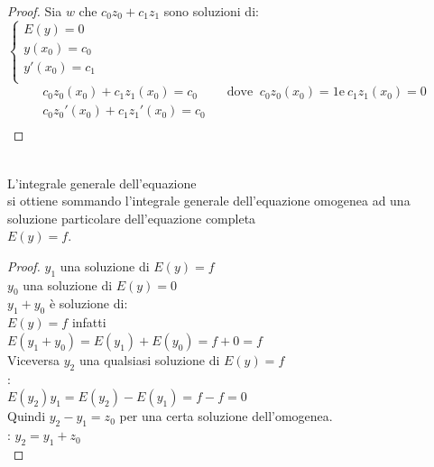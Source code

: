 \documentclass[a4paper, oneside]{article}
\begin{document}
\begin{proof}
    Sia $w$ che $c_0 z_0 + c_1 z_1$ sono soluzioni di:\\
    $
    \begin{cases}
        E(y) = 0\\
        y(x_0) = c_0\\
        y'(x_0) = c_1\\
    \end{cases}
    $
    \begin{gather*}
        c_0 z_0 (x_0) + c_1 z_1 (x_0) = c_0 \qquad \text{ dove } \ c_0 z_0 (x_0)= 1 \text{e} \ c_1 z_1 (x_0) = 0\\
        c_0 z_0' (x_0) + c_1 z_1' (x_0) = c_0 \qquad \\
    \end{gather*}
\end{proof}
\begin{theorem}
    \hfil\\
    L'integrale generale dell'equazione \\
    si ottiene sommando l'integrale generale dell'equazione omogenea ad una soluzione particolare dell'equazione completa\\
    $E(y) = f$.
\end{theorem}

\begin{proof}
     $y_1$ una soluzione di $E(y) = f$\\
     $y_0$ una soluzione di $E(y) = 0$\\
     $y_1 + y_0$ è soluzione di:\\
    $E(y) = f$ infatti\\
    $E(y_1 + y_0) = E(y_1) + E(y_0) = f + 0 = f$\\
    Viceversa  $y_2$ una qualsiasi soluzione di $E(y) = f$\\
    :\\
    $E(y_2) y_1 = E(y_2) - E(y_1) = f - f = 0$\\
    Quindi $y_2 - y_1 = z_0$ per una certa soluzione dell'omogenea.\\
    : $y_2 = y_1 + z_0$\\
\end{proof}
\end{document}
